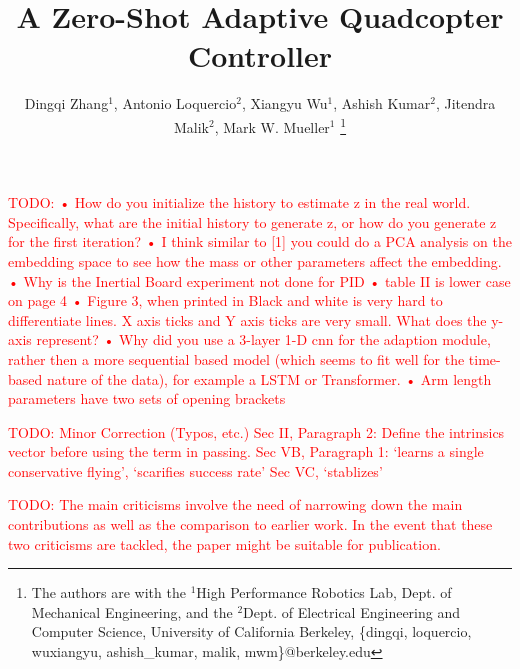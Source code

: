 \documentclass[letterpaper, 10 pt, conference]{ieeeconf}  %
\title{\LARGE \bf
A Zero-Shot Adaptive Quadcopter Controller
}
\author{Dingqi Zhang$^1$, Antonio Loquercio$^2$, Xiangyu Wu$^1$, Ashish Kumar$^2$, Jitendra Malik$^2$, Mark W. Mueller$^1$%
\thanks{The authors are with the $^1$High Performance Robotics Lab, Dept. of Mechanical Engineering, and the $^2$Dept. of Electrical Engineering and Computer Science, University of California Berkeley, \{dingqi, loquercio, wuxiangyu, ashish\_kumar, malik, mwm\}@berkeley.edu} 
}
\newcommand{\todo}[1]{\textcolor{red}{TODO: #1}}
\begin{document}
\maketitle
\maketitle
\thispagestyle{empty}
\pagestyle{empty}

\todo{•	How do you initialize the history to estimate z in
the real world. Specifically, what are the initial history
to generate z, or how do you generate z for the first
iteration?
•	I think similar to [1] you could do a PCA analysis
on the embedding space to see how the mass or other
parameters affect the embedding. 
•	Why is the Inertial Board experiment not done for
PID
•	table II is lower case on page 4
•	Figure 3, when printed in Black and white is very
hard to differentiate lines.  X axis ticks and Y axis ticks
are very small. What does the y-axis represent?
•	Why did you use a 3-layer 1-D cnn for the adaption
module, rather then a more sequential based model (which
seems to fit well for the time-based nature of the data),
for example a LSTM or Transformer. 
•	Arm length parameters have two sets of opening
brackets }

\todo{Minor Correction (Typos, etc.)
Sec II, Paragraph 2: Define the intrinsics vector before
using the term in passing.
Sec VB, Paragraph 1: ‘learns a single conservative flying’,
‘scarifies success rate’
Sec VC, ‘stablizes’}

\todo{The main criticisms involve the need of narrowing down the
main contributions as well as the comparison to earlier
work. In the event that these two criticisms are tackled,
the paper might be suitable for publication.}
\end{document}
